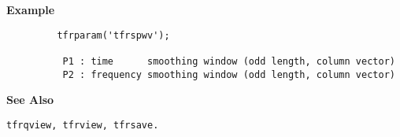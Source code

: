 {\bf \large \sf Example}
\begin{verbatim}
         tfrparam('tfrspwv');
 
          P1 : time      smoothing window (odd length, column vector)
          P2 : frequency smoothing window (odd length, column vector)
\end{verbatim}
\vspace*{.5cm}

{\bf \large \sf See Also}\\
\hspace*{1.5cm}
\begin{minipage}[t]{13.5cm}
\begin{verbatim}
tfrqview, tfrview, tfrsave.
\end{verbatim}
\end{minipage}

